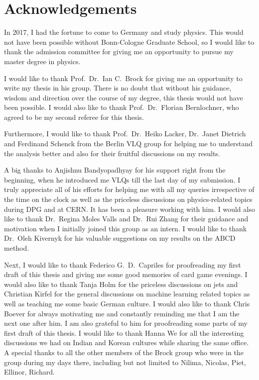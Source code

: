 \chapter{Acknowledgements}
\label{sec:acknowledgements}
In 2017, I had the fortune to come to Germany and study physics. This would not have been possible without Bonn-Cologne Graduate School, so I would like to thank the admission committee for giving me an opportunity to pursue my master degree in physics.

I would like to thank Prof.\ Dr.\ Ian C.\ Brock for giving me an opportunity to write my thesis in his group. There is no doubt that without his guidance, wisdom and direction over the course of my degree, this thesis would not have been possible. I would also like to thank Prof.\ Dr.\ Florian Bernlochner, who agreed to be my second referee for this thesis.

Furthermore, I would like to thank Prof.\ Dr.\ Heiko Lacker, Dr.\ Janet Dietrich and Ferdinand Schenck from the Berlin VLQ group for helping me to understand the analysis better and also for their fruitful discussions on my results.

A big thanks to Anjishnu Bandyopadhyay for his support right from the beginning, when he introduced me VLQs till the last day of my submission. I truly appreciate all of his efforts for helping me with all my queries irrespective of the time on the clock as well as the priceless discussions on physics-related topics during DPG and at CERN. It has been a pleasure working with him. I would also like to thank Dr.\ Regina Moles Valls and Dr.\ Rui Zhang for their guidance and motivation when I initially joined this group as an intern. I would like to thank Dr.\ Oleh Kivernyk for his valuable suggestions on my results on the ABCD method.

Next, I would like to thank Federico G.\ D.\ Capriles for proofreading my first draft of this thesis and giving me some good memories of card game evenings. I would also like to thank Tanja Holm for the priceless discussions on jets and Christian Kirfel for the general discussions on machine learning related topics as well as teaching me some basic German culture. I would also like to thank Chris Boever for always motivating me and constantly reminding me that I am the next one after him. I am also grateful to him for proofreading some parts of my first draft of this thesis. I would like to thank Hanna We for all the interesting discussions we had on Indian and Korean cultures while sharing the same office. A special thanks to all the other members of the Brock group who were in the group during my days there, including but not limited to Nilima, Nicolas, Piet, Ellinor, Richard.

